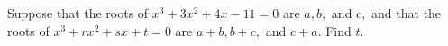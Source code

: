 Suppose that the roots of $x^3+3x^2+4x-11=0$ are $a, b,$ and $c,$ and that the roots of $x^3+rx^2+sx+t=0$ are $a+b, b+c,$ and $c+a.$  Find $t.$